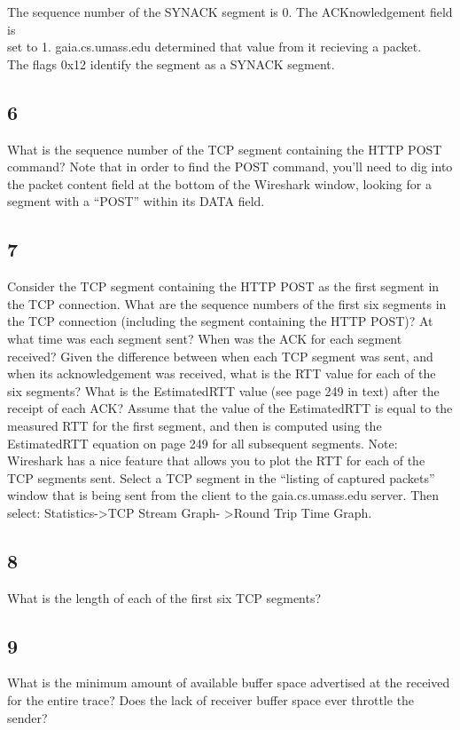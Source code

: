 \documentclass[12pt]{article}
\begin{document}
The sequence number of the SYNACK segment is 0. The ACKnowledgement field is \\
set to 1. gaia.cs.umass.edu determined that value from it recieving a packet.\\
The flags 0x12 identify the segment as a SYNACK segment.

\subsection{6}
What is the sequence number of the TCP segment containing the HTTP POST
command? Note that in order to find the POST command, you’ll need to dig into
the packet content field at the bottom of the Wireshark window, looking for a
segment with a “POST” within its DATA field.

\subsection{7}
Consider the TCP segment containing the HTTP POST as the first segment in the
TCP connection. What are the sequence numbers of the first six segments in the
TCP connection (including the segment containing the HTTP POST)? At what
time was each segment sent? When was the ACK for each segment received?
Given the difference between when each TCP segment was sent, and when its
acknowledgement was received, what is the RTT value for each of the six
segments? What is the EstimatedRTT value (see page 249 in text) after the
receipt of each ACK? Assume that the value of the EstimatedRTT is equal to
the measured RTT for the first segment, and then is computed using the
EstimatedRTT equation on page 249 for all subsequent segments.
Note: Wireshark has a nice feature that allows you to plot the RTT for
each of the TCP segments sent. Select a TCP segment in the “listing of
captured packets” window that is being sent from the client to the
gaia.cs.umass.edu server. Then select: Statistics->TCP Stream Graph-
>Round Trip Time Graph.

\subsection{8}
What is the length of each of the first six TCP segments?

\subsection{9}
What is the minimum amount of available buffer space advertised at the received
for the entire trace? Does the lack of receiver buffer space ever throttle the
sender?
\end{document}
